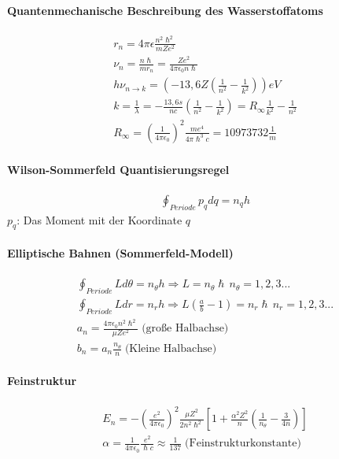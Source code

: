 \documentclass[10pt,a4paper]{article}
\begin{document}
\paragraph{Quantenmechanische Beschreibung des Wasserstoffatoms}$\;$ \\
\begin{align}
r_n = 4 \pi \epsilon \frac{n^2 \hslash^2}{mZe^2}\\
\nu_n = \frac{n\hslash}{m r_n} = \frac{Ze^2}{4\pi \epsilon_0 n \hslash}\\
h\nu_{n\rightarrow k} = (-13,6 Z (\frac{1}{n^2}-\frac{1}{k^2}))eV\\
k=\frac{1}{\lambda} =- \frac{13,6 s}{nc}(\frac{1}{n^2}-\frac{1}{k^2}) = R_\infty \frac{1}{k^2}-\frac{1}{n^2}\\
R_\infty = (\frac{1}{4\pi \epsilon_0})^2\frac{me^4}{4\pi \hslash^3 c}= 10973732 \frac{1}{m}
\end{align}
\paragraph{Wilson-Sommerfeld Quantisierungsregel}$\,$\\
\begin{align}
\oint_{Periode} p_q dq = n_qh
\end{align}
$p_q$: Das Moment mit der Koordinate $q$\\
\paragraph{Elliptische Bahnen (Sommerfeld-Modell)}$\,$\\
\begin{align}
\oint_{Periode} Ld\theta = n_\theta h \Rightarrow L= n_\theta \hslash \, n_\theta = 1,2,3...\\
\oint_{Periode} Ldr = n_r h \Rightarrow L(\frac{a}{b}-1)= n_r \hslash \, n_r = 1,2,3...\\
a_n = \frac{4\pi \epsilon_0 n^2 \hslash^2}{\mu Z e^2} \; \text{(große Halbachse)}\\
b_n= a_n \frac{n_\theta}{n}\; \text{(Kleine Halbachse)}
\end{align}
\paragraph{Feinstruktur}$\,$\\
\begin{align}
E_n = - (\frac{e^2}{4\pi\epsilon_0})^2 \frac{\mu Z^2}{2n^2\hslash^2}[1+\frac{\alpha^2 Z^2}{n}(\frac{1}{n_\theta}-\frac{3}{4n})]\\
\alpha = \frac{1}{4\pi \epsilon_0}\frac{e^2}{\hslash c}\approx \frac{1}{137} \; \text{(Feinstrukturkonstante)}
\end{align}
\end{document}
